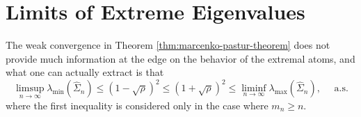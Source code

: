 \section{Limits of Extreme Eigenvalues}

The weak convergence in Theorem \ref{thm:marcenko-pastur-theorem} does not provide much information at the edge on the behavior of the extremal atoms, and what one can actually extract is that
\begin{equation}
    \limsup_{n\rightarrow\infty}\lambda_{\min}\left(\widehat{\Sigma}_{n}\right)\leq(1-\sqrt{\rho})^{2}\leq(1+\sqrt{\rho})^{2}\leq\liminf_{n\rightarrow\infty}\lambda_{\max}\left(\widehat{\Sigma}_{n}\right),\quad\text{ a.s.}
\end{equation}
where the first inequality is considered only in the case where $m_{n}\geq n$.
